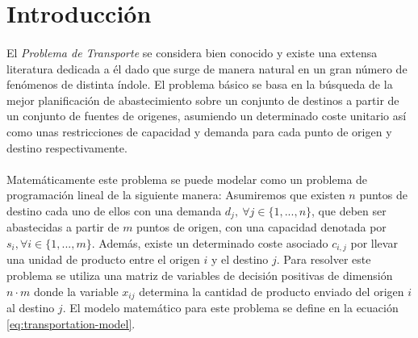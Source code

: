 \documentclass[a4paper, spanish]{article}
\begin{document}
  \maketitle

  \begin{abstract}
    \noindent [TODO]
  \end{abstract}


  \section{Introducción}
  \label{sec:introduction}

    \paragraph{}
    El \emph{Problema de Transporte} se considera bien conocido y existe una extensa literatura dedicada a él dado que surge de manera natural en un gran número de fenómenos de distinta índole. El problema básico se basa en la búsqueda de la mejor planificación de abastecimiento sobre un conjunto de destinos a partir de un conjunto de fuentes de origenes, asumiendo un determinado coste unitario así como unas restricciones de capacidad y demanda para cada punto de origen y destino respectivamente.

    \paragraph{}
    Matemáticamente este problema se puede modelar como un problema de programación lineal de la siguiente manera: Asumiremos que existen $n$ puntos de destino cada uno de ellos con una demanda $d_j, \ \forall j \in \{1,...,n\}$, que deben ser abastecidas a partir de $m$ puntos de origen, con una capacidad denotada por $s_{i}, \forall i \in \{1, ..., m\}$. Además, existe un determinado coste asociado $c_{i, j}$ por llevar una unidad de producto entre el origen $i$ y el destino $j$. Para resolver este problema se utiliza una matriz de variables de decisión positivas de dimensión $n \cdot m$ donde la variable $x_{ij}$ determina la cantidad de producto enviado del origen $i$ al destino $j$. El modelo matemático para este problema se define en la ecuación \eqref{eq:transportation-model}.
\end{document}
